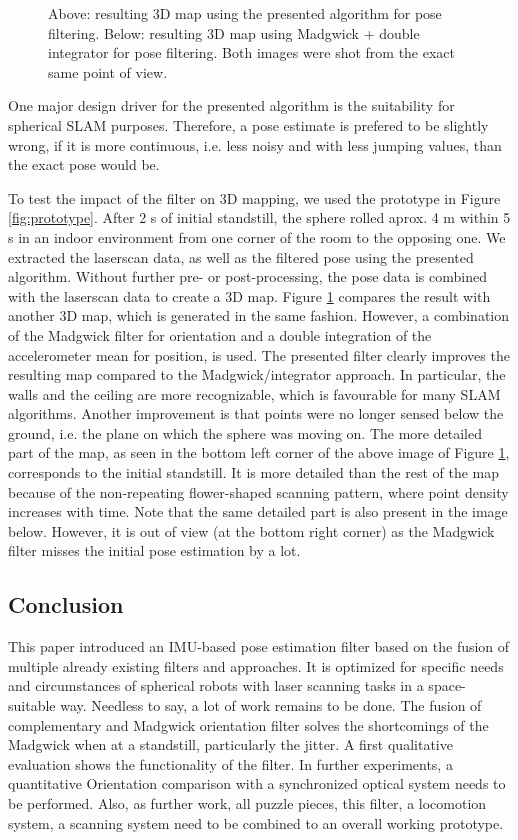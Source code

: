 \documentclass[letterpaper, 10 pt, conference]{ieeeconf}  %
\begin{document}
\begin{figure}
\begin{center}
\caption{Above: resulting 3D map using the presented algorithm for pose filtering. Below: resulting 3D map using Madgwick + double integrator for pose filtering. Both images were shot from the exact same point of view. }
\label{fig:mapping}
\end{center}
\end{figure}

One major design driver for the presented algorithm is the suitability for spherical SLAM purposes.
Therefore, a pose estimate is prefered to be slightly wrong, if it is more continuous, i.e. less noisy and with less jumping values, than the exact pose would be.

To test the impact of the filter on 3D mapping, we used the prototype in Figure \ref{fig:prototype}.
After 2 s of initial standstill, the sphere rolled aprox. 4 m within 5 s in an indoor environment from one corner of the room to the opposing one.
We extracted the laserscan data, as well as the filtered pose using the presented algorithm.
Without further pre- or post-processing, the pose data is combined with the laserscan data to create a 3D map.
Figure \ref{fig:mapping} compares the result with another 3D map, which is generated in the same fashion.
However, a combination of the Madgwick filter for orientation and a double integration of the accelerometer mean for position, is used.
The presented filter clearly improves the resulting map compared to the Madgwick/integrator approach.
In particular, the walls and the ceiling are more recognizable, which is favourable for many SLAM algorithms.
Another improvement is that points were no longer sensed below the ground, i.e. the plane on which the sphere was moving on.
The more detailed part of the map, as seen in the bottom left corner of the above image of Figure \ref{fig:mapping}, corresponds to the initial standstill.
It is more detailed than the rest of the map because of the non-repeating flower-shaped scanning pattern, where point density increases with time.
Note that the same detailed part is also present in the image below.
However, it is out of view (at the bottom right corner) as the Madgwick filter misses the initial pose estimation by a lot. 


\subsection{Conclusion}
This paper introduced an IMU-based pose estimation filter based on the fusion of multiple already existing filters and approaches.
It is optimized for specific needs and circumstances of spherical robots with laser scanning tasks in a space-suitable way.
Needless to say, a lot of work remains to be done.
The fusion of complementary and Madgwick orientation filter solves the shortcomings of the Madgwick when at a standstill, particularly the jitter.
A first qualitative evaluation shows the functionality of the filter.
In further experiments, a quantitative Orientation comparison with a synchronized optical system needs to be performed.
Also, as further work, all puzzle pieces, this filter, a locomotion system, a scanning system need to be combined to an overall working prototype.
\end{document}
